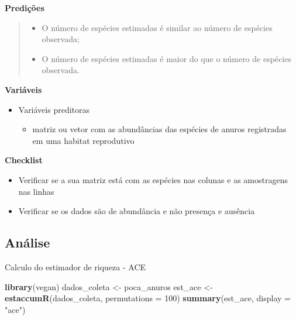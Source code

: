\documentclass[
]{book}
\newenvironment{Shaded}{\begin{snugshade}}{\end{snugshade}}
\newcommand{\DataTypeTok}[1]{\textcolor[rgb]{0.13,0.29,0.53}{#1}}
\newcommand{\DecValTok}[1]{\textcolor[rgb]{0.00,0.00,0.81}{#1}}
\newcommand{\KeywordTok}[1]{\textcolor[rgb]{0.13,0.29,0.53}{\textbf{#1}}}
\newcommand{\NormalTok}[1]{#1}
\newcommand{\StringTok}[1]{\textcolor[rgb]{0.31,0.60,0.02}{#1}}
\providecommand{\tightlist}{%
  \setlength{\itemsep}{0pt}\setlength{\parskip}{0pt}}
\begin{document}
\textbf{Predições}

\begin{quote}
\begin{itemize}
\tightlist
\item
  O número de espécies estimadas é similar ao número de espécies observada;
\item
  O número de espécies estimadas é maior do que o número de espécies observada.
\end{itemize}
\end{quote}

\textbf{Variáveis}

\begin{itemize}
\tightlist
\item
  Variáveis preditoras

  \begin{itemize}
  \tightlist
  \item
    matriz ou vetor com as abundâncias das espécies de anuros registradas em uma habitat reprodutivo
  \end{itemize}
\end{itemize}

\textbf{Checklist}

\begin{itemize}
\tightlist
\item
  Verificar se a sua matriz está com as espécies nas colunas e as amostragens nas linhas
\item
  Verificar se os dados são de abundância e não presença e ausência
\end{itemize}

\hypertarget{anuxe1lise-3}{%
\subsection{Análise}\label{anuxe1lise-3}}

Calculo do estimador de riqueza - ACE

\begin{Shaded}
\begin{Highlighting}[]
\KeywordTok{library}\NormalTok{(vegan)}
\NormalTok{dados_coleta <-}\StringTok{ }\NormalTok{poca_anuros}
\NormalTok{est_ace <-}\StringTok{ }\KeywordTok{estaccumR}\NormalTok{(dados_coleta, }\DataTypeTok{permutations =} \DecValTok{100}\NormalTok{)}
\KeywordTok{summary}\NormalTok{(est_ace, }\DataTypeTok{display =} \StringTok{"ace"}\NormalTok{)}
\end{Highlighting}
\end{Shaded}
\end{document}
